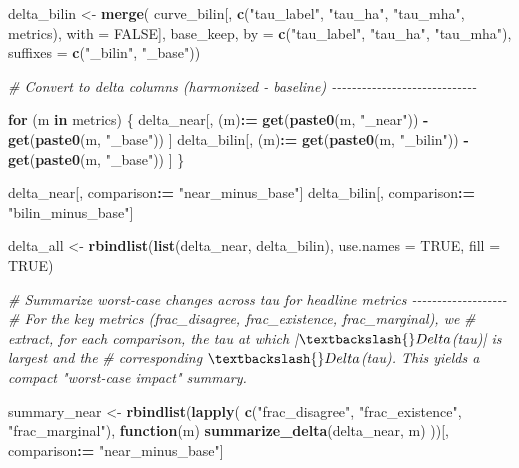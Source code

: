 \documentclass[
  11pt,
]{article}
\newenvironment{Shaded}{\begin{snugshade}}{\end{snugshade}}
\newcommand{\AttributeTok}[1]{\textcolor[rgb]{0.13,0.29,0.53}{#1}}
\newcommand{\CommentTok}[1]{\textcolor[rgb]{0.56,0.35,0.01}{\textit{#1}}}
\newcommand{\ConstantTok}[1]{\textcolor[rgb]{0.56,0.35,0.01}{#1}}
\newcommand{\ControlFlowTok}[1]{\textcolor[rgb]{0.13,0.29,0.53}{\textbf{#1}}}
\newcommand{\FunctionTok}[1]{\textcolor[rgb]{0.13,0.29,0.53}{\textbf{#1}}}
\newcommand{\NormalTok}[1]{#1}
\newcommand{\OtherTok}[1]{\textcolor[rgb]{0.56,0.35,0.01}{#1}}
\newcommand{\SpecialCharTok}[1]{\textcolor[rgb]{0.81,0.36,0.00}{\textbf{#1}}}
\newcommand{\StringTok}[1]{\textcolor[rgb]{0.31,0.60,0.02}{#1}}
\begin{document}
\begin{Shaded}
\begin{Highlighting}[]
\NormalTok{delta\_bilin }\OtherTok{\textless{}{-}} \FunctionTok{merge}\NormalTok{(}
\NormalTok{  curve\_bilin[, }\FunctionTok{c}\NormalTok{(}\StringTok{"tau\_label"}\NormalTok{, }\StringTok{"tau\_ha"}\NormalTok{, }\StringTok{"tau\_mha"}\NormalTok{, metrics), }\AttributeTok{with =} \ConstantTok{FALSE}\NormalTok{],}
\NormalTok{  base\_keep,}
  \AttributeTok{by =} \FunctionTok{c}\NormalTok{(}\StringTok{"tau\_label"}\NormalTok{, }\StringTok{"tau\_ha"}\NormalTok{, }\StringTok{"tau\_mha"}\NormalTok{),}
  \AttributeTok{suffixes =} \FunctionTok{c}\NormalTok{(}\StringTok{"\_bilin"}\NormalTok{, }\StringTok{"\_base"}\NormalTok{))}

\CommentTok{\# Convert to delta columns (harmonized {-} baseline) {-}{-}{-}{-}{-}{-}{-}{-}{-}{-}{-}{-}{-}{-}{-}{-}{-}{-}{-}{-}{-}{-}{-}{-}{-}{-}{-}{-}{-}}

\ControlFlowTok{for}\NormalTok{ (m }\ControlFlowTok{in}\NormalTok{ metrics) \{}
\NormalTok{  delta\_near[, (m)}\SpecialCharTok{:=} \FunctionTok{get}\NormalTok{(}\FunctionTok{paste0}\NormalTok{(m, }\StringTok{"\_near"}\NormalTok{)) }\SpecialCharTok{{-}} \FunctionTok{get}\NormalTok{(}\FunctionTok{paste0}\NormalTok{(m, }\StringTok{"\_base"}\NormalTok{)) ]}
\NormalTok{  delta\_bilin[, (m)}\SpecialCharTok{:=} \FunctionTok{get}\NormalTok{(}\FunctionTok{paste0}\NormalTok{(m, }\StringTok{"\_bilin"}\NormalTok{)) }\SpecialCharTok{{-}} \FunctionTok{get}\NormalTok{(}\FunctionTok{paste0}\NormalTok{(m, }\StringTok{"\_base"}\NormalTok{)) ]}
\NormalTok{\}}

\NormalTok{delta\_near[, comparison}\SpecialCharTok{:=} \StringTok{"near\_minus\_base"}\NormalTok{]}
\NormalTok{delta\_bilin[, comparison}\SpecialCharTok{:=} \StringTok{"bilin\_minus\_base"}\NormalTok{]}

\NormalTok{delta\_all }\OtherTok{\textless{}{-}} \FunctionTok{rbindlist}\NormalTok{(}\FunctionTok{list}\NormalTok{(delta\_near, delta\_bilin), }\AttributeTok{use.names =} \ConstantTok{TRUE}\NormalTok{, }\AttributeTok{fill =} \ConstantTok{TRUE}\NormalTok{)}

\CommentTok{\# Summarize worst{-}case changes across tau for headline metrics {-}{-}{-}{-}{-}{-}{-}{-}{-}{-}{-}{-}{-}{-}{-}{-}{-}{-}{-}}
\CommentTok{\# For the key metrics (frac\_disagree, frac\_existence, frac\_marginal), we}
\CommentTok{\# extract, for each comparison, the tau at which |$\textbackslash{}Delta$(tau)| is largest and the}
\CommentTok{\# corresponding $\textbackslash{}Delta$(tau). This yields a compact "worst{-}case impact" summary.}

\NormalTok{summary\_near }\OtherTok{\textless{}{-}} \FunctionTok{rbindlist}\NormalTok{(}\FunctionTok{lapply}\NormalTok{(}
  \FunctionTok{c}\NormalTok{(}\StringTok{"frac\_disagree"}\NormalTok{, }\StringTok{"frac\_existence"}\NormalTok{, }\StringTok{"frac\_marginal"}\NormalTok{),}
  \ControlFlowTok{function}\NormalTok{(m) }\FunctionTok{summarize\_delta}\NormalTok{(delta\_near, m)}
\NormalTok{))[, comparison}\SpecialCharTok{:=} \StringTok{"near\_minus\_base"}\NormalTok{]}


\end{Highlighting}
\end{Shaded}
\end{document}
